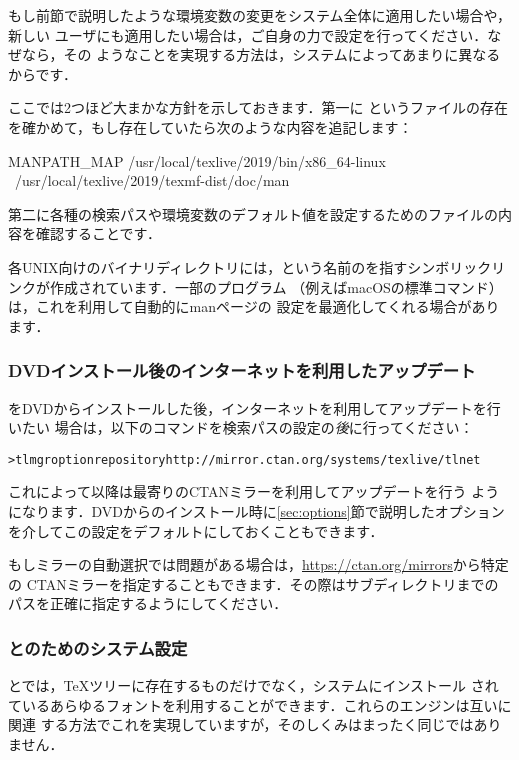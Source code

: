 \documentclass[uplatex,dvipdfmx,tombow]{jsarticle}
\begin{document}
もし前節で説明したような環境変数の変更をシステム全体に適用したい場合や，新しい
ユーザにも適用したい場合は，ご自身の力で設定を行ってください．なぜなら，その
ようなことを実現する方法は，システムによってあまりに異なるからです．

ここでは2つほど大まかな方針を示しておきます．第一に%
というファイルの存在を確かめて，もし存在していたら次のような内容を追記します：
%
\begin{sverbatim}
MANPATH_MAP /usr/local/texlive/2019/bin/x86_64-linux \
            /usr/local/texlive/2019/texmf-dist/doc/man
\end{sverbatim}
%
第二に各種の検索パスや環境変数のデフォルト値を設定するためのファイルの内容を確認することです．

各UNIX向けのバイナリディレクトリには，という名前のを指すシンボリックリンクが作成されています．一部のプログラム
（例えばmacOSの標準コマンド）は，これを利用して自動的にmanページの
設定を最適化してくれる場合があります．

\subsubsection{DVDインストール後のインターネットを利用したアップデート}
\label{sec:dvd-install-net-updates}

\TL をDVDからインストールした後，インターネットを利用してアップデートを行いたい
場合は，以下のコマンドを検索パスの設定の\emph{後}に行ってください：
%
\begin{alltt}
> tlmgr option repository http://mirror.ctan.org/systems/texlive/tlnet
\end{alltt}
%
これによって以降は最寄りのCTANミラーを利用してアップデートを行う
ようになります．DVDからのインストール時に\ref{sec:options}節で説明したオプション
を介してこの設定をデフォルトにしておくこともできます．

もしミラーの自動選択では問題がある場合は，\url{https://ctan.org/mirrors}から特定の
CTANミラーを指定することもできます．その際はサブディレクトリまでの
パスを正確に指定するようにしてください．

\subsubsection{\XeTeX と\LuaTeX のためのシステム設定}
\label{sec:font-conf-sys}

\XeTeX と\LuaTeX では，\TeX ツリーに存在するものだけでなく，システムにインストール
されているあらゆるフォントを利用することができます．これらのエンジンは互いに関連
する方法でこれを実現していますが，そのしくみはまったく同じではありません．
\end{document}

